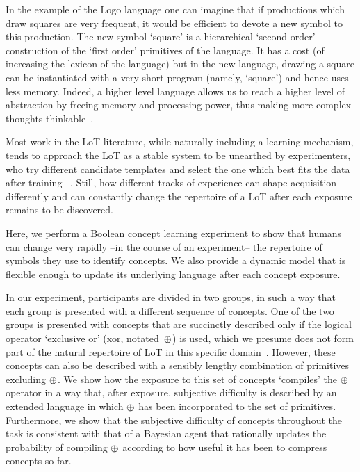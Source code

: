 In the example of the Logo language one can imagine that if productions which draw squares are very frequent, it would be efficient to devote a new symbol to this production. The new symbol `square' is a hierarchical `second order' construction of the `first order' primitives of the language. It has a cost (of increasing the lexicon of the language) but in the new language, drawing a square can be instantiated with a very short program (namely, `square') and hence uses less memory. Indeed, a higher level language allows us to reach a higher level of abstraction by freeing memory and processing power, thus making more complex thoughts thinkable~\cite{minsky1967computation,murphy1988comprehending}.

Most work in the LoT literature, while naturally including a learning mechanism, tends to approach the LoT as a stable system to be unearthed by experimenters, who try different candidate templates and select the one which best fits the data after training ~\cite{goodman2008rational,kemp2012exploring,piantadosi2016logical}. Still, how different tracks of experience can shape acquisition differently and can constantly change the repertoire of a LoT after each exposure remains to be discovered.

Here, we perform a Boolean concept learning experiment to show that humans can change very rapidly --in the course of an experiment-- the repertoire of symbols they use to identify concepts. We also provide a dynamic model that is flexible enough to update its underlying language after each concept exposure. 

In our experiment, participants are divided in two groups, in such a way that each group is presented with a different sequence of concepts. One of the two groups is presented with concepts that are succinctly described only if the logical operator `exclusive or' (xor, notated~$\oplus$) is used, which we presume does not form part of the natural repertoire of LoT in this specific domain~\cite{piantadosi2016logical}. However, these concepts can also be described with a sensibly lengthy combination of primitives excluding $\oplus$. We show how the exposure to this set of concepts `compiles' the $\oplus$ operator in a way that, after exposure, subjective difficulty is described by an extended language in which $\oplus$ has been incorporated to the set of primitives. Furthermore, we show that the subjective difficulty of concepts throughout the task is consistent with that of a Bayesian agent that rationally updates the probability of compiling $\oplus$ according to how useful it has been to compress concepts so far.

